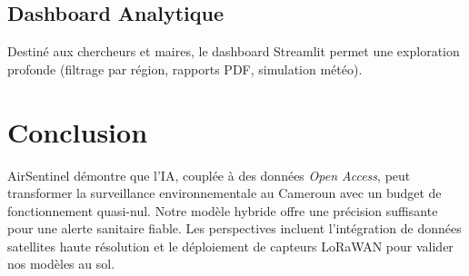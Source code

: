 \documentclass[12pt,a4paper]{report}
\begin{document}
\section{Dashboard Analytique}
Destiné aux chercheurs et maires, le dashboard Streamlit permet une exploration profonde (filtrage par région, rapports PDF, simulation météo).

\chapter{Conclusion}
AirSentinel démontre que l'IA, couplée à des données \textit{Open Access}, peut transformer la surveillance environnementale au Cameroun avec un budget de fonctionnement quasi-nul. Notre modèle hybride offre une précision suffisante pour une alerte sanitaire fiable. Les perspectives incluent l'intégration de données satellites haute résolution et le déploiement de capteurs LoRaWAN pour valider nos modèles au sol.



\end{document}
